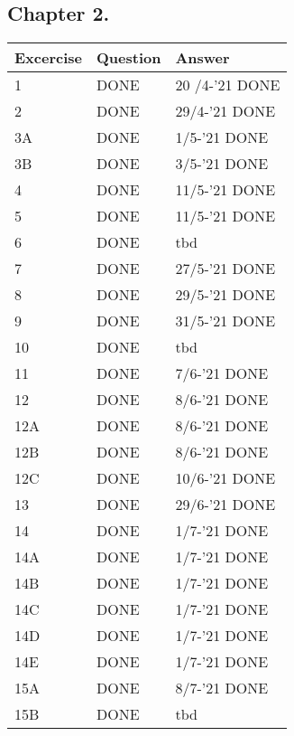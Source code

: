 \subsection*{Chapter 2.}
\begin{tabular}{|l|l|l|}
    \hline
    \rowcolor[HTML]{EFEFEF}
    {\color[HTML]{000000} Excercise } & {\color[HTML]{000000} Question } & {\color[HTML]{000000} Answer } \\ \hline
    1 & DONE & 20 /4-'21 DONE \\ \hline
    2 & DONE & 29/4-'21 DONE \\ \hline
    3A & DONE & 1/5-'21 DONE \\ \hline
    3B & DONE & 3/5-'21 DONE \\ \hline
    4 & DONE & 11/5-'21 DONE \\ \hline
    5 & DONE & 11/5-'21 DONE \\ \hline
    6 & DONE & tbd \\ \hline
    7 & DONE & 27/5-'21 DONE \\ \hline
    8 & DONE & 29/5-'21 DONE \\ \hline
    9 & DONE & 31/5-'21 DONE \\ \hline
    10 & DONE & tbd \\ \hline
    11 & DONE & 7/6-'21 DONE \\ \hline
    12 & DONE & 8/6-'21 DONE \\ \hline
    12A & DONE & 8/6-'21 DONE \\ \hline
    12B & DONE & 8/6-'21 DONE \\ \hline
    12C & DONE & 10/6-'21 DONE \\ \hline
    13 & DONE & 29/6-'21 DONE \\ \hline
    14 & DONE & 1/7-'21 DONE \\ \hline
    14A & DONE & 1/7-'21 DONE \\ \hline
    14B & DONE & 1/7-'21 DONE \\ \hline
    14C & DONE & 1/7-'21 DONE \\ \hline
    14D & DONE & 1/7-'21 DONE \\ \hline
    14E & DONE & 1/7-'21 DONE \\ \hline
    15A & DONE & 8/7-'21 DONE \\ \hline
    15B & DONE & tbd \\ \hline
\end{tabular}
